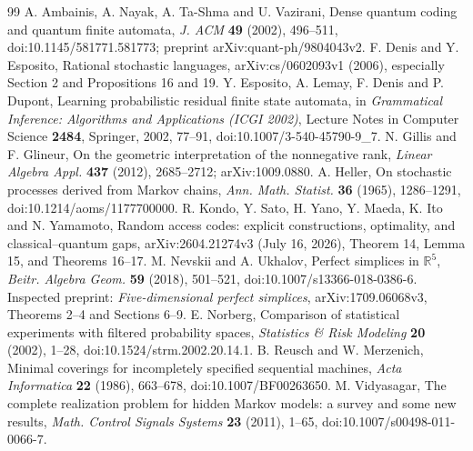 \begin{thebibliography}{99}
 A. Ambainis, A. Nayak, A. Ta-Shma and U. Vazirani,
Dense quantum coding and quantum finite automata,
\emph{J. ACM} \textbf{49} (2002), 496--511,
doi:10.1145/581771.581773; preprint arXiv:quant-ph/9804043v2.
 F. Denis and Y. Esposito, Rational stochastic
languages, arXiv:cs/0602093v1 (2006), especially Section 2 and
Propositions 16 and 19.
 Y. Esposito, A. Lemay, F. Denis and P. Dupont,
Learning probabilistic residual finite state automata, in
\emph{Grammatical Inference: Algorithms and Applications (ICGI 2002)},
Lecture Notes in Computer Science \textbf{2484}, Springer, 2002,
77--91, doi:10.1007/3-540-45790-9\_7.
 N. Gillis and F. Glineur, On the geometric interpretation
of the nonnegative rank, \emph{Linear Algebra Appl.} \textbf{437}
(2012), 2685--2712; arXiv:1009.0880.
 A. Heller, On stochastic processes derived from
Markov chains, \emph{Ann. Math. Statist.} \textbf{36} (1965),
1286--1291, doi:10.1214/aoms/1177700000.
 R. Kondo, Y. Sato, H. Yano, Y. Maeda, K. Ito and
N. Yamamoto, Random access codes: explicit constructions, optimality,
and classical--quantum gaps, arXiv:2604.21274v3 (July 16, 2026),
Theorem 14, Lemma 15, and Theorems 16--17.
 M. Nevskii and A. Ukhalov, Perfect simplices in
$\mathbb R^5$, \emph{Beitr. Algebra Geom.} \textbf{59} (2018),
501--521, doi:10.1007/s13366-018-0386-6. Inspected preprint:
\emph{Five-dimensional perfect simplices}, arXiv:1709.06068v3,
Theorems 2--4 and Sections 6--9.
 E. Norberg, Comparison of statistical experiments
with filtered probability spaces, \emph{Statistics \& Risk Modeling}
\textbf{20} (2002), 1--28, doi:10.1524/strm.2002.20.14.1.
 B. Reusch and W. Merzenich, Minimal coverings for
incompletely specified sequential machines, \emph{Acta Informatica}
\textbf{22} (1986), 663--678, doi:10.1007/BF00263650.
 M. Vidyasagar, The complete realization problem
for hidden Markov models: a survey and some new results,
\emph{Math. Control Signals Systems} \textbf{23} (2011), 1--65,
doi:10.1007/s00498-011-0066-7.
\end{thebibliography}

